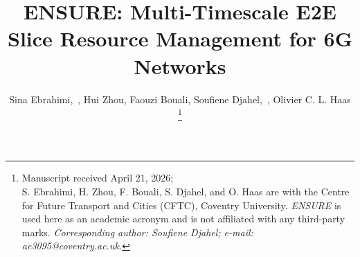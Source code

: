 \documentclass[12pt,lettersize,journal,onecolumn]{IEEEtran}
\begin{document}
\title{ENSURE: Multi-Timescale E2E Slice Resource Management for 6G Networks} 


\author{Sina Ebrahimi,~,
        Hui Zhou, %
        Faouzi Bouali, %
        Soufiene Djahel,~,
        Olivier C. L. Haas %
\thanks{Manuscript received April 21, 2026; \\S. Ebrahimi, H. Zhou, F. Bouali, S. Djahel, and O. Haas are with the Centre for Future Transport and Cities (CFTC), Coventry University. \textit{ENSURE} is used here as an academic acronym and is not affiliated with any third-party marks. \textit{Corresponding author: Soufiene Djahel; e-mail: ae3095@coventry.ac.uk.}}} %

\end{document}
